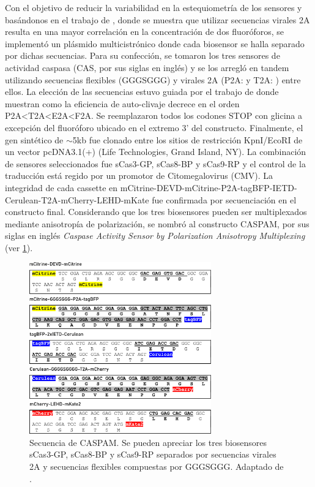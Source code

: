 Con el objetivo de reducir la variabilidad en la estequiometría de los sensores y basándonos en el trabajo de \cite{Goedhart2011}, donde se muestra que utilizar secuencias virales 2A resulta en una mayor correlación en la concentración de dos fluoróforos, se implementó un plásmido multicistrónico donde cada biosensor se halla separado por dichas secuencias. Para su confección, se tomaron los tres sensores de actividad caspasa (CAS, por sus siglas en inglés) y se los arregló en tandem utilizando secuencias flexibles (GGGSGGG) y virales 2A (P2A:  y T2A: ) entre ellos. La elección de las secuencias estuvo guiada por el trabajo de \cite{Liu2017} donde muestran como la eficiencia de auto-clivaje decrece en el orden P2A\textless T2A\textless E2A\textless F2A. Se reemplazaron todos los codones STOP con glicina a excepción del fluoróforo ubicado en el extremo 3' del constructo. Finalmente, el gen sintético de $\sim$5kb fue clonado entre los sitios de restricción KpnI/EcoRI de un vector pcDNA3.1(+) (Life Technologies, Grand Island, NY). La combinación de sensores seleccionados fue sCas3-GP, sCas8-BP y sCas9-RP y el control de la traducción está regido por un promotor de Citomegalovirus (CMV). La integridad de cada cassette en mCitrine-DEVD-mCitrine-P2A-tagBFP-IETD-Cerulean-T2A-mCherry-LEHD-mKate fue confirmada por secuenciación en el constructo final. Considerando que los tres biosensores pueden ser multiplexados mediante anisotropía de polarización, se nombró al constructo CASPAM, por sus siglas en inglés \textit{Caspase Activity Sensor by Polarization Anisotropy Multiplexing} (ver \cref{fig:secuencia}).

\begin{figure}[htb]
    \centering
    \includegraphics[width=0.7\textwidth]{img/cap_3/CASPAM_seq.pdf}
    \caption{\footnotesize{Secuencia de CASPAM. Se pueden apreciar los tres biosensores sCas3-GP, sCas8-BP y sCas9-RP separados por secuencias virales 2A y secuencias flexibles compuestas por GGGSGGG. Adaptado de \cite{Habif2021}.}}
    \label{fig:secuencia}
\end{figure}

